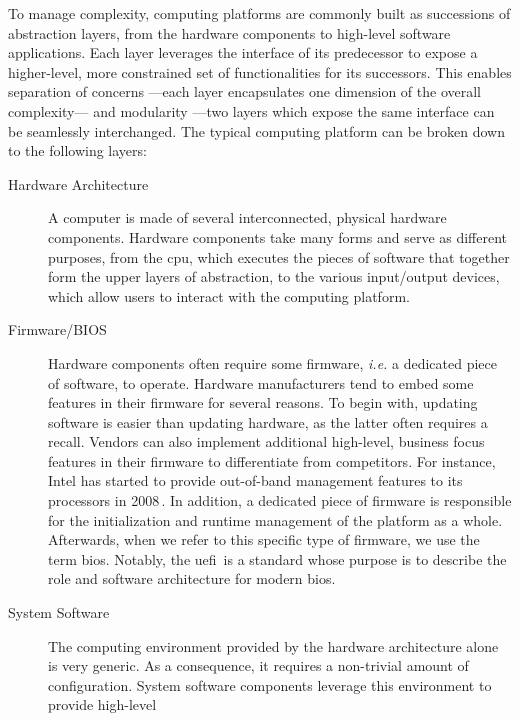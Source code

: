 To manage complexity, computing platforms are commonly built as successions of
abstraction layers, from the hardware components to high-level software
applications.
%
Each layer leverages the interface of its predecessor to expose a higher-level,
more constrained set of functionalities for its successors.
%
This enables separation of concerns ---each layer encapsulates one dimension of
the overall complexity--- and modularity ---two layers which expose the same
interface can be seamlessly interchanged.
%
The typical computing platform can be broken down to the following layers: 
%
\begin{description}
\item [Hardware Architecture]
  A computer is made of several inter\-connected, physical hardware components.
  Hardware components take many forms and serve as different purposes, from the
  \ac{cpu}, which executes the pieces of software that together form the upper
  layers of abstraction, to the various input/output devices, which allow users
  to interact with the computing platform.
\item [Firmware/BIOS]
  Hardware components often require some firm\-ware, \emph{i.e.} a dedicated
  piece of software, to operate.
  Hardware manufacturers tend to embed some features in their firmware for
  several reasons.
  To begin with, updating software is easier than updating hardware, as the
  latter often requires a recall.
  Vendors can also implement additional high-level, business focus features in
  their firmware to differentiate from competitors.
  For instance, Intel has started to provide out-of-band management features to
  its processors in 2008\,\cite{ruan2014me}.
  In addition, a dedicated piece of firmware is responsible for the
  initialization and runtime management of the platform as a whole.
  Afterwards, when we refer to this specific type of firmware, we use the term
  \ac{bios}.
  Notably, the \ac{uefi}\,\cite{uefi2017uefi} is a standard whose purpose is to
  describe the role and software architecture for modern \ac{bios}.
\item [System Software]
  The computing environment provided by the hardware architecture alone is very
  generic.
  As a consequence, it requires a non-trivial amount of configuration.
  System software components leverage this environment to provide high-level

\end{description}
